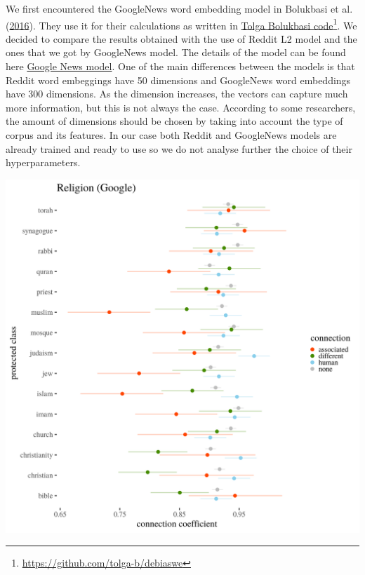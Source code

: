 \documentclass[12pt,]{book}
\begin{document}
We first encountered the GoogleNews word embedding model in Bolukbasi et
al. (\protect\hyperlink{ref-Bolukbasi2016Man}{2016}). They use it for
their calculations as written in
\href{https://github.com/tolga-b/debiaswe}{Tolga Bolukbasi
code}\footnote{\url{https://github.com/tolga-b/debiaswe}}. We decided to
compare the results obtained with the use of Reddit L2 model and the
ones that we got by GoogleNews model. The details of the model can be
found here \href{https://code.google.com/archive/p/word2vec/}{Google
News model}. One of the main differences between the models is that
Reddit word embeggings have 50 dimensions and GoogleNews word embeddings
have 300 dimensions. As the dimension increases, the vectors can capture
much more information, but this is not always the case. According to
some researchers, the amount of dimensions should be chosen by taking
into account the type of corpus and its features. In our case both
Reddit and GoogleNews models are already trained and ready to use so we
do not analyse further the choice of their hyperparameters.

\includegraphics[width=14cm]{../images/visReligionGoogle.png}
\end{document}
